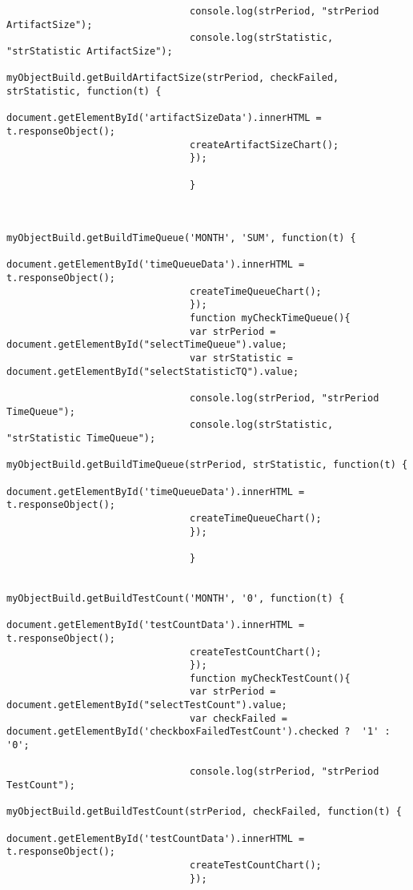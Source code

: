 \begin{lstlisting}
                                console.log(strPeriod, "strPeriod ArtifactSize");
                                console.log(strStatistic, "strStatistic ArtifactSize");
                                myObjectBuild.getBuildArtifactSize(strPeriod, checkFailed, strStatistic, function(t) {
                                document.getElementById('artifactSizeData').innerHTML = t.responseObject();
                                createArtifactSizeChart();
                                });

                                }


                                myObjectBuild.getBuildTimeQueue('MONTH', 'SUM', function(t) {
                                document.getElementById('timeQueueData').innerHTML = t.responseObject();
                                createTimeQueueChart();
                                });
                                function myCheckTimeQueue(){
                                var strPeriod = document.getElementById("selectTimeQueue").value;
                                var strStatistic = document.getElementById("selectStatisticTQ").value;

                                console.log(strPeriod, "strPeriod TimeQueue");
                                console.log(strStatistic, "strStatistic TimeQueue");
                                myObjectBuild.getBuildTimeQueue(strPeriod, strStatistic, function(t) {
                                document.getElementById('timeQueueData').innerHTML = t.responseObject();
                                createTimeQueueChart();
                                });

                                }

                                myObjectBuild.getBuildTestCount('MONTH', '0', function(t) {
                                document.getElementById('testCountData').innerHTML = t.responseObject();
                                createTestCountChart();
                                });
                                function myCheckTestCount(){
                                var strPeriod = document.getElementById("selectTestCount").value;
                                var checkFailed = document.getElementById('checkboxFailedTestCount').checked ?  '1' : '0';

                                console.log(strPeriod, "strPeriod TestCount");
                                myObjectBuild.getBuildTestCount(strPeriod, checkFailed, function(t) {
                                document.getElementById('testCountData').innerHTML = t.responseObject();
                                createTestCountChart();
                                });


\end{lstlisting}
